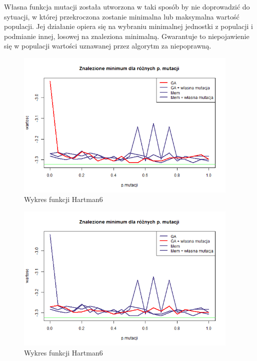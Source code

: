 \documentclass[11pt, a4paper]{article}
\newcommand{\fbi}{\leavevmode{\parindent=1em\indent}}
\begin{document}
\fbi
Własna funkcja mutacji została utworzona w taki sposób by nie doprowadzić do sytuacji, w której przekroczona zostanie minimalna lub maksymalna wartość populacji. Jej działanie opiera się na wybraniu minimalnej jednostki z populacji i podmianie innej, losowej na znaleziona minimalną. Gwarantuje to niepojawienie się w populacji wartości uznawanej przez algorytm za niepoprawną.

\begin{figure}[H]
	\centering
	\includegraphics[width=0.95\textwidth]{./assets/Hartman6mut1.png}
	\caption{Wykres funkcji Hartman6}
	\label{fig:Hartman6mut1}
\end{figure}

\begin{figure}[H]
	\centering
	\includegraphics[width=0.95\textwidth]{./assets/Hartman6mut2.png}
	\caption{Wykres funkcji Hartman6}
	\label{fig:Hartman6mut2}
\end{figure}
\end{document}
